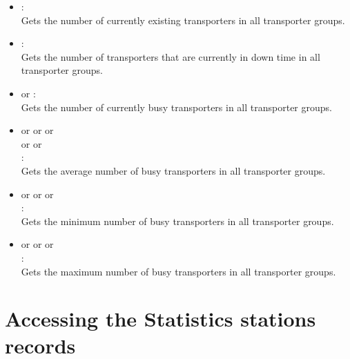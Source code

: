 \begin{itemize}

\item
{}:\\
Gets the number of currently existing transporters in all transporter groups.
  
\item
{}:\\
Gets the number of transporters that are currently in down time in all transporter groups.
  
\item
{} or :\\
Gets the number of currently busy transporters in all transporter groups.
  
\item
{} or  or  or\\
 or  or\\
:\\
Gets the average number of busy transporters in all transporter groups.
  
\item
{} or  or  or\\
:\\
Gets the minimum number of busy transporters in all transporter groups.
  
\item
{} or  or  or\\
:\\
Gets the maximum number of busy transporters in all transporter groups.

\end{itemize}



\section{Accessing the Statistics stations records}

